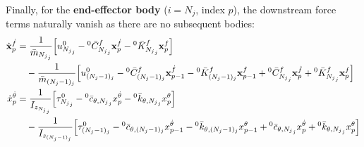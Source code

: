 \documentclass[11pt]{article}
\theoremstyle{definition}
\begin{document}
Finally, for the \textbf{end-effector body} ($i = N_j$, index $p$), the downstream force terms naturally vanish as there are no subsequent bodies:
\begin{align}
    \dot{\mathbf{x}}_{p}^{\dot{f}} &= 
    \frac{1}{\bar{m}_{{N_j}_j}} \Big[ u^0_{{N_j}_j} - {}^0\bar{C}^f_{{N_j}_j}\mathbf{x}_{p}^{\dot{f}} - {}^0\bar{K}^f_{{N_j}_j}\mathbf{x}_{p}^f \Big] \notag \\
    &\quad - \frac{1}{\bar{m}_{({N_j}-1)_j}} \Big[ u^0_{({N_j}-1)_j} - {}^0\bar{C}^f_{({N_j}-1)_j}\mathbf{x}_{p-1}^{\dot{f}} - {}^0\bar{K}^f_{({N_j}-1)_j}\mathbf{x}_{p-1}^f + {}^0\bar{C}^f_{{N_j}_j}\mathbf{x}_{p}^{\dot{f}} + {}^0\bar{K}^f_{{N_j}_j}\mathbf{x}_{p}^f \Big] \\
    \dot{x}_{p}^{\dot{\theta}} &= 
    \frac{1}{I_{z_{{N_j}_j}}} \Big[ \tau^0_{{N_j}_j} - {}^0\bar{c}_{\theta,{N_j}_j}x_{p}^{\dot{\theta}} - {}^0\bar{k}_{\theta,{N_j}_j}x_{p}^{\theta} \Big] \notag \\
    &\quad - \frac{1}{I_{z_{({N_j}-1)_j}}} \Big[ \tau^0_{({N_j}-1)_j} - {}^0\bar{c}_{\theta,({N_j}-1)_j}x_{p-1}^{\dot{\theta}} - {}^0\bar{k}_{\theta,({N_j}-1)_j}x_{p-1}^{\theta} + {}^0\bar{c}_{\theta,{N_j}_j}x_{p}^{\dot{\theta}} + {}^0\bar{k}_{\theta,{N_j}_j}x_{p}^{\theta} \Big]
\end{align}

\printbibliography
\end{document}
